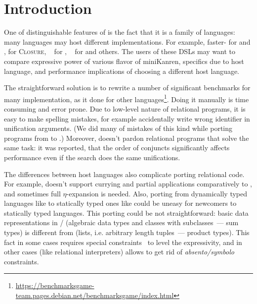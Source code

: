 

\section{Introduction}
\label{sec:intro}


One of distinguishable features of \miniKanren{} is the fact that it is a family of languages:
many languages may host different \miniKanren{} implementations.
For example, faster-\miniKanren{} for \Scheme{} and \Racket{}, \CoreLogic{} for \textsc{Closure}, \OCanren{}~\cite{OCanren} for \OCaml{}, \Klogic{}~\cite{Klogic} for \Kotlin{} and others.
The users of these DSLs may want to compare expressive power of various flavor of miniKanren, specifics due to host language, and performance implications of choosing a different host language.


The straightforward solution is to rewrite a number of significant benchmarks for many implementation, as it done for other languages\footnote{\url{https://benchmarksgame-team.pages.debian.net/benchmarksgame/index.html}}.
Doing it manually is time consuming and error prone.
Due to low-level nature of relational programs, it is easy to make spelling mistakes, for example accidentally write wrong identifier in unification arguments.
(We did many of mistakes of this kind while porting programs from \OCanren{} to \Klogic{}.) Moreover, \miniKanren{} doesn't pardon relational programs that solve the same task: it was reported, that the order of conjuncts significantly affects~\cite{scheduling2022} performance even if the search does the same unifications.

The differences between host languages also complicate porting relational code.
For example, \Kotlin{} doesn't support currying and partial applications comparatively to \OCaml{}, and sometimes full $\eta$-expansion is needed.
Also, porting from dynamically typed languages like \Scheme{} to statically typed ones like \OCaml{} could be uneasy for newcomers to statically typed languages.
This porting could be not straightforward:
basic data representations in \OCaml{}/\Klogic{} (algebraic data types and classes with subclasses~--- sum types) is different from \Scheme{} (lists, i.e. arbitrary length tuples~--- product types).
This fact in some cases requires special constraints~\cite{wildcards} to level the expressivity, and in other cases (like relational interpreters) allows to get rid of \emph{absento/symbolo} constraints.

